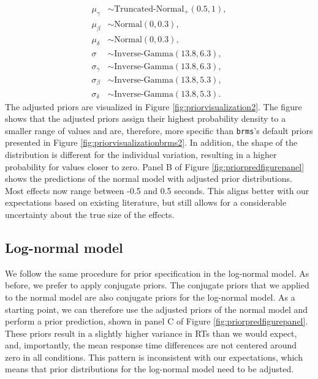 \documentclass[
  english,
  doc,floatsintext]{apa6}
\begin{document}
\begin{equation}
\begin{aligned}
\mu_{\gamma} &\sim \text{Truncated-Normal}_{+}(0.5, 1), \label{eq:chosenpriors2sd} \\
\mu_{\beta} &\sim \text{Normal}(0, 0.3), \\ 
\mu_{\delta} &\sim \text{Normal}(0, 0.3), \\  
\sigma &\sim \text{Inverse-Gamma}(13.8, 6.3),  \\ 
\sigma_{\gamma} &\sim \text{Inverse-Gamma}(13.8, 6.3), \\   
\sigma_{\beta} &\sim \text{Inverse-Gamma}(13.8, 5.3), \\    
\sigma_{\delta} &\sim \text{Inverse-Gamma}(13.8, 5.3).     
\end{aligned}
\end{equation}
The adjusted priors are visualized in Figure \ref{fig:priorvisualization2}. The figure shows that the adjusted priors assign their highest probability density to a smaller range of values and are, therefore, more specific than \texttt{brms}'s default priors presented in Figure \ref{fig:priorvisualizationbrms2}. In addition, the shape of the distribution is different for the individual variation, resulting in a higher probability for values closer to zero. Panel B of Figure \ref{fig:priorpredfigurepanel} shows the predictions of the normal model with adjusted prior distributions. Most effects now range between -0.5 and 0.5 seconds. This aligns better with our expectations based on existing literature, but still allows for a considerable uncertainty about the true size of the effects.

\hypertarget{log-normal-model-1}{%
\subsection{Log-normal model}\label{log-normal-model-1}}

We follow the same procedure for prior specification in the log-normal model. As before, we prefer to apply conjugate priors. The conjugate priors that we applied to the normal model are also conjugate priors for the log-normal model. As a starting point, we can therefore use the adjusted priors of the normal model and perform a prior prediction, shown in panel C of Figure \ref{fig:priorpredfigurepanel}. These priors result in a slightly higher variance in RTs than we would expect, and, importantly, the mean response time differences are not centered around zero in all conditions. This pattern is inconsistent with our expectations, which means that prior distributions for the log-normal model need to be adjusted.
\end{document}
